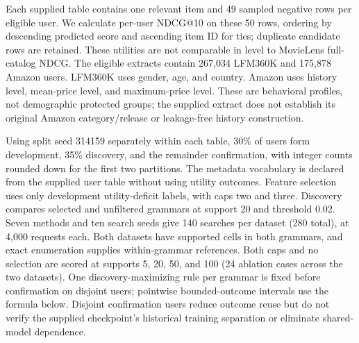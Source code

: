 \documentclass[sigconf,nonacm]{acmart}
\begin{document}
Each supplied table contains one relevant item and 49 sampled negative rows per eligible user. We calculate per-user NDCG@10 on these 50 rows, ordering by descending predicted score and ascending item ID for ties; duplicate candidate rows are retained. These utilities are not comparable in level to MovieLens full-catalog NDCG. The eligible extracts contain 267,034 LFM360K and 175,878 Amazon users. LFM360K uses gender, age, and country. Amazon uses history level, mean-price level, and maximum-price level. These are behavioral profiles, not demographic protected groups; the supplied extract does not establish its original Amazon category/release or leakage-free history construction.

Using split seed 314159 separately within each table, 30\% of users form development, 35\% discovery, and the remainder confirmation, with integer counts rounded down for the first two partitions. The metadata vocabulary is declared from the supplied user table without using utility outcomes. Feature selection uses only development utility-deficit labels, with caps two and three. Discovery compares selected and unfiltered grammars at support 20 and threshold 0.02. Seven methods and ten search seeds give 140 searches per dataset (280 total), at 4,000 requests each. Both datasets have supported cells in both grammars, and exact enumeration supplies within-grammar references. Both caps and no selection are scored at supports 5, 20, 50, and 100 (24 ablation cases across the two datasets). One discovery-maximizing rule per grammar is fixed before confirmation on disjoint users; pointwise bounded-outcome intervals use the formula below. Disjoint confirmation users reduce outcome reuse but do not verify the supplied checkpoint's historical training separation or eliminate shared-model dependence.
\end{document}
